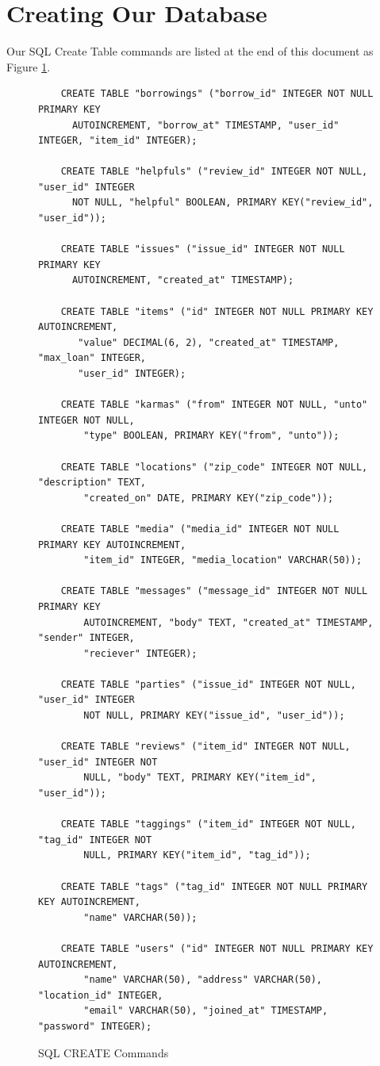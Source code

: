 \documentclass{acm_proc_article-sp}
\begin{document}
\section{Creating Our Database}
Our SQL Create Table commands are listed at the end of this document as Figure \ref{fig:SQLCreateCommands}.
\begin{figure}[p]
    \begin{verbatim}
    CREATE TABLE "borrowings" ("borrow_id" INTEGER NOT NULL PRIMARY KEY 
      AUTOINCREMENT, "borrow_at" TIMESTAMP, "user_id" INTEGER, "item_id" INTEGER);

    CREATE TABLE "helpfuls" ("review_id" INTEGER NOT NULL, "user_id" INTEGER 
      NOT NULL, "helpful" BOOLEAN, PRIMARY KEY("review_id", "user_id"));

    CREATE TABLE "issues" ("issue_id" INTEGER NOT NULL PRIMARY KEY 
      AUTOINCREMENT, "created_at" TIMESTAMP);

    CREATE TABLE "items" ("id" INTEGER NOT NULL PRIMARY KEY AUTOINCREMENT, 
       "value" DECIMAL(6, 2), "created_at" TIMESTAMP, "max_loan" INTEGER, 
       "user_id" INTEGER);

    CREATE TABLE "karmas" ("from" INTEGER NOT NULL, "unto" INTEGER NOT NULL, 
        "type" BOOLEAN, PRIMARY KEY("from", "unto"));

    CREATE TABLE "locations" ("zip_code" INTEGER NOT NULL, "description" TEXT, 
        "created_on" DATE, PRIMARY KEY("zip_code"));

    CREATE TABLE "media" ("media_id" INTEGER NOT NULL PRIMARY KEY AUTOINCREMENT, 
        "item_id" INTEGER, "media_location" VARCHAR(50));

    CREATE TABLE "messages" ("message_id" INTEGER NOT NULL PRIMARY KEY 
        AUTOINCREMENT, "body" TEXT, "created_at" TIMESTAMP, "sender" INTEGER, 
        "reciever" INTEGER);

    CREATE TABLE "parties" ("issue_id" INTEGER NOT NULL, "user_id" INTEGER 
        NOT NULL, PRIMARY KEY("issue_id", "user_id"));

    CREATE TABLE "reviews" ("item_id" INTEGER NOT NULL, "user_id" INTEGER NOT 
        NULL, "body" TEXT, PRIMARY KEY("item_id", "user_id"));

    CREATE TABLE "taggings" ("item_id" INTEGER NOT NULL, "tag_id" INTEGER NOT 
        NULL, PRIMARY KEY("item_id", "tag_id"));

    CREATE TABLE "tags" ("tag_id" INTEGER NOT NULL PRIMARY KEY AUTOINCREMENT, 
        "name" VARCHAR(50));

    CREATE TABLE "users" ("id" INTEGER NOT NULL PRIMARY KEY AUTOINCREMENT, 
        "name" VARCHAR(50), "address" VARCHAR(50), "location_id" INTEGER, 
        "email" VARCHAR(50), "joined_at" TIMESTAMP, "password" INTEGER);
    \end{verbatim}
    \caption{SQL CREATE Commands}
    \label{fig:SQLCreateCommands}
\end{figure}
\end{document}
